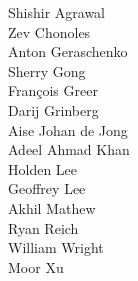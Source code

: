 Shishir Agrawal\\
Zev Chonoles\\
Anton Geraschenko\\
Sherry Gong\\
Fran\c{c}ois Greer\\
Darij Grinberg\\
Aise Johan de Jong\\
Adeel Ahmad Khan\\
Holden Lee\\
Geoffrey Lee\\
Akhil Mathew\\
Ryan Reich\\
William Wright\\
Moor Xu\\
